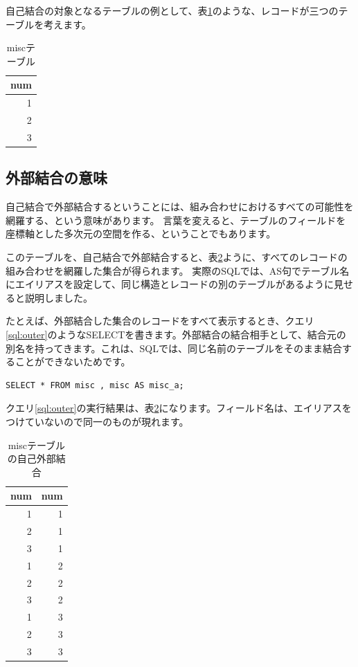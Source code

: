 自己結合の対象となるテーブルの例として、表\ref{table:misc}のような、レコードが三つのテーブルを考えます。

\begin{table}[htbp]
  \begin{tabular}{|r|} \hline
    num \\ \hline \hline  
    1 \\
    2 \\
    3 \\ \hline
  \end{tabular}
  \caption{miscテーブル}
  \label{table:misc}
\end{table}





\subsection{外部結合の意味}
自己結合で外部結合するということには、組み合わせにおけるすべての可能性を網羅する、という意味があります。
言葉を変えると、テーブルのフィールドを座標軸とした多次元の空間を作る、ということでもあります。



このテーブルを、自己結合で外部結合すると、表\ref{table:miscouter}ように、すべてのレコードの組み合わせを網羅した集合が得られます。
実際のSQLでは、AS句でテーブル名にエイリアスを設定して、同じ構造とレコードの別のテーブルがあるように見せると説明しました。

たとえば、外部結合した集合のレコードをすべて表示するとき、クエリ\ref{sql:outer}のようなSELECTを書きます。外部結合の結合相手として、結合元の別名を持ってきます。これは、SQLでは、同じ名前のテーブルをそのまま結合することができないためです。

\begin{lstlisting}[caption=自己結合の外部結合,label=sql:outer]
SELECT * FROM misc , misc AS misc_a;
\end{lstlisting}

クエリ\ref{sql:outer}の実行結果は、表\ref{table:miscouter}になります。フィールド名は、エイリアスをつけていないので同一のものが現れます。

\begin{table}[htbp]
  \begin{tabular}{|r|r|} \hline
    num & num \\ \hline \hline  
    1 & 1 \\
    2 & 1 \\
    3 & 1 \\ 
    1 & 2 \\
    2 & 2 \\
    3 & 2 \\
    1 & 3 \\
    2 & 3 \\
    3 & 3 \\ \hline
  \end{tabular}
  \caption{miscテーブルの自己外部結合}
  \label{table:miscouter}
\end{table}


